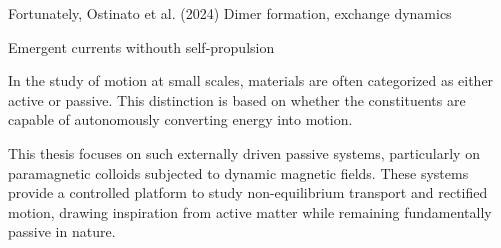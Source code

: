 Fortunately, Ostinato et al. (2024)
Dimer formation, exchange dynamics

Emergent currents withouth self-propulsion

In the study of motion at small scales, materials are often categorized as either active or passive. This distinction is based on whether the constituents are capable of autonomously converting energy into motion.


This thesis focuses on such externally driven passive systems, particularly on paramagnetic colloids subjected to dynamic magnetic fields. These systems provide a controlled platform to study non-equilibrium transport and rectified motion, drawing inspiration from active matter while remaining fundamentally passive in nature.

\newpage
